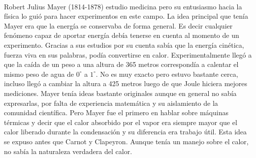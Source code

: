 \\
Robert Julius Mayer (1814-1878) estudio medicina pero su entusiasmo hacia la física lo guió para hacer experimentos en este campo. La idea principal que tenía Mayer era que la energía se conservaba de forma general. Es decir cualquier fenómeno capaz de aportar energía debía tenerse en cuenta al momento de un experimento. Gracias a sus estudios por su cuenta sabía que la energía cinética, fuerza viva en sus  palabras, podía convertirse en calor. Experimentalmente llegó a que la caída de un peso a una altura  de 365 metros correspondía a calentar el mismo peso de agua de $0^{\circ}$ a $1^{\circ}$. No es muy exacto pero estuvo bastante cerca, incluso llegó a cambiar la altura a 425 metros luego de que Joule hiciera mejores mediciones. Mayer tenía ideas bastante originales aunque en general no sabía expresarlas, por falta de experiencia matemática y su aislamiento de la comunidad científica. Pero Mayer fue el primero en hablar sobre máquinas térmicas y decir que el calor absorbido por el vapor era siempre mayor que el calor liberado durante la condensación y su diferencia era trabajo útil. Esta idea se expuso antes que Carnot y Clapeyron. Aunque tenía un manejo sobre el calor, no sabía la naturaleza verdadera del calor.
\\
